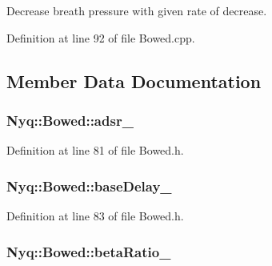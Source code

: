 Decrease breath pressure with given rate of decrease. 



Definition at line 92 of file Bowed.\+cpp.



\subsection{Member Data Documentation}
\subsubsection[{\texorpdfstring{adsr\+\_\+}{adsr_}}]{ Nyq\+::\+Bowed\+::adsr\+\_\+\hspace{0.3cm}{\ttfamily [protected]}}\hypertarget{class_nyq_1_1_bowed_af619b9a4fed6ca5c79a33bd3cb00940a}{}\label{class_nyq_1_1_bowed_af619b9a4fed6ca5c79a33bd3cb00940a}


Definition at line 81 of file Bowed.\+h.

\subsubsection[{\texorpdfstring{base\+Delay\+\_\+}{baseDelay_}}]{ Nyq\+::\+Bowed\+::base\+Delay\+\_\+\hspace{0.3cm}{\ttfamily [protected]}}\hypertarget{class_nyq_1_1_bowed_a4b44dfe1a617a2b06b6b180b8422d792}{}\label{class_nyq_1_1_bowed_a4b44dfe1a617a2b06b6b180b8422d792}


Definition at line 83 of file Bowed.\+h.

\subsubsection[{\texorpdfstring{beta\+Ratio\+\_\+}{betaRatio_}}]{ Nyq\+::\+Bowed\+::beta\+Ratio\+\_\+\hspace{0.3cm}{\ttfamily [protected]}}\hypertarget{class_nyq_1_1_bowed_a626766a3c1de1d4278333fc5449c24f8}{}\label{class_nyq_1_1_bowed_a626766a3c1de1d4278333fc5449c24f8}


